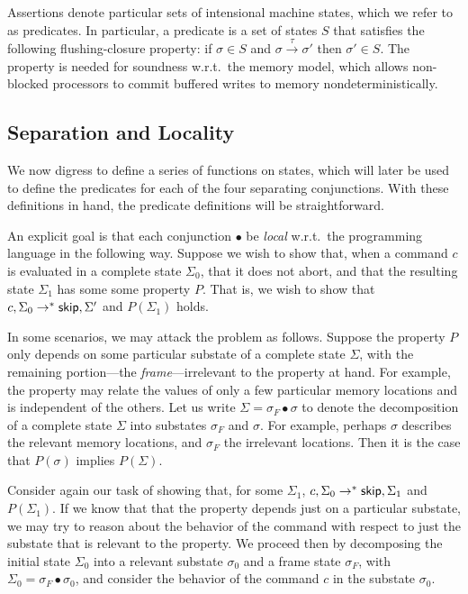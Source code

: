 \documentclass[11pt]{article}
\begin{document}
Assertions denote particular sets of intensional machine states, which we refer to as predicates. In particular, a predicate is a set of states $S$ that satisfies the following flushing-closure property: if $\sigma \in S$ and $\sigma \stackrel{\tau}{\rightarrow} \sigma'$ then $\sigma' \in S$. The property is needed for soundness w.r.t.\ the memory model, which allows non-blocked processors to commit buffered writes to memory nondeterministically.  

\subsection{Separation and Locality}

We now digress to define a series of functions on states, which will later be used to define the predicates for each of the four separating conjunctions. With these definitions in hand, the predicate definitions will be straightforward.

An explicit goal is that each conjunction $\bullet$ be \emph{local} w.r.t.\ the programming language in the following way. Suppose we wish to show that, when a command $c$ is evaluated in a complete state $\Sigma_0$, that it does not abort, and that the resulting state $\Sigma_1$ has some some property $P$. That is, we wish to show that $c,\Sigma_0 \rightarrow^\ast \operatorname{\mathsf{skip}},\Sigma'$ and $P(\Sigma_1)$ holds. 

In some scenarios, we may attack the problem as follows. Suppose the property $P$ only depends on some particular substate of a complete state $\Sigma$, with the remaining portion---the \emph{frame}---irrelevant to the property at hand. For example, the property may relate the values of only a few particular memory locations and is independent of the others. Let us write $\Sigma = \sigma_F \bullet \sigma$ to denote the decomposition of a complete state $\Sigma$ into substates $\sigma_F$ and $\sigma$. For example, perhaps $\sigma$ describes the relevant memory locations, and $\sigma_F$ the irrelevant locations. Then it is the case that $P(\sigma)$ implies $P(\Sigma)$. 

Consider again our task of showing that, for some $\Sigma_1$, $c,\Sigma_0 \rightarrow^\ast \operatorname{\mathsf{skip}},\Sigma_1$ and $P(\Sigma_1)$. If we know that that the property depends just on a particular substate, we may try to reason about the behavior of the command with respect to just the substate that is relevant to the property. We proceed then by decomposing the initial state $\Sigma_0$ into a relevant substate $\sigma_0$ and a frame state $\sigma_F$, with $\Sigma_0 = \sigma_F \bullet \sigma_0$, and consider the behavior of the command $c$ in the substate $\sigma_0$. 
\end{document}
